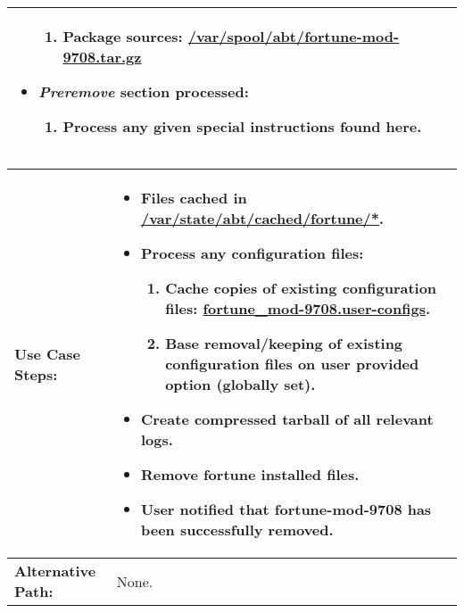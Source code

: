 \begin{tabularx}{\linewidth}{|l|X|}
\begin{minipage}{\linewidth}
\begin{itemize}
\begin{enumerate}
      \item Package sources: \url{/var/spool/abt/fortune-mod-9708.tar.gz}
    \end{enumerate}
    \item \emph{Preremove} section processed:
    \begin{enumerate}
      \item Process any given special instructions found here.
    \end{enumerate}
  \end{itemize}
  \vspace{0.05em}
\end{minipage}
\\
\hline 
\end{tabularx}

\begin{tabularx}{\linewidth}{|l|X|}
\hline
\textbf{Use Case Steps:} & 
\begin{minipage}{\linewidth} 
  \vspace{0.05em}
  \begin{itemize}
    \item Files cached in \url{/var/state/abt/cached/fortune/*}.
    \item Process any configuration files:
    \begin{enumerate}
      \item Cache copies of existing configuration files: \url{fortune_mod-9708.user-configs}.
      \item Base removal/keeping of existing configuration files on user provided option (globally set).
    \end{enumerate}
    \item Create compressed tarball of all relevant logs.
    \item Remove fortune installed files.
    \item User notified that fortune-mod-9708 has been successfully removed.
  \end{itemize}
  \vspace{0.05em}
\end{minipage}
\\
\hline 
\textbf{Alternative Path:} & None. \\
\hline
\end{tabularx}